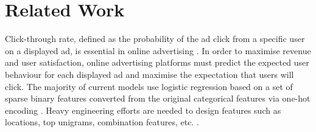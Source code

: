 \documentclass{llncs}
\begin{document}



\vspace{-5pt}
\section{Related Work}
\vspace{-5pt}


Click-through rate, defined as the probability of the ad click from a specific user on a displayed ad, is essential in online advertising \cite{wang2010click}. In order to maximise revenue and user satisfaction, online advertising platforms must predict the expected user behaviour for each displayed ad and maximise the expectation that users will click. The majority of current models use logistic regression based on a set of sparse binary features converted from the original categorical features via one-hot encoding \cite{lee2012estimating,richardson2007predicting}. Heavy engineering efforts are needed to design features such as locations, top unigrams, combination features, etc. \cite{he2014practical}.
\end{document}
